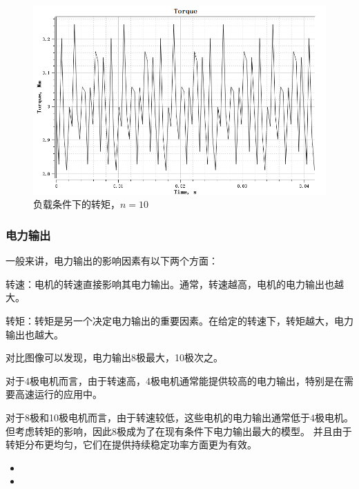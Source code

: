 \documentclass{thuemp}
\begin{document}
\begin{figure}[H]
  \centering
  \includegraphics[width=1\linewidth]{./img/task3/torque-n10-load.png}
  \caption{负载条件下的转矩，$n=10$}
\end{figure}

\subsubsection{电力输出}
一般来讲，电力输出的影响因素有以下两个方面：

转速：电机的转速直接影响其电力输出。通常，转速越高，电机的电力输出也越大。

转矩：转矩是另一个决定电力输出的重要因素。在给定的转速下，转矩越大，电力输出也越大。

对比图像可以发现，电力输出8极最大，10极次之。

对于4极电机而言，由于转速高，4极电机通常能提供较高的电力输出，特别是在需要高速运行的应用中。

对于8极和10极电机而言，由于转速较低，这些电机的电力输出通常低于4极电机。
但考虑转矩的影响，因此8极成为了在现有条件下电力输出最大的模型。
并且由于转矩分布更均匀，它们在提供持续稳定功率方面更为有效。
\begin{itemize}
	\item 
	\item 
\end{itemize}
\end{document}
